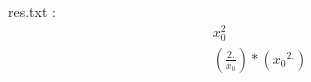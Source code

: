 \documentclass[12pt]{article}
\begin{document}
 res.txt : \\

\Large \begin{gather*}
x_0^2
\\
\left(\frac{2.}{{x_{0}}}\right)*\left({x_{0}}^{2.}\right)
\end{gather*}
\end{document}

